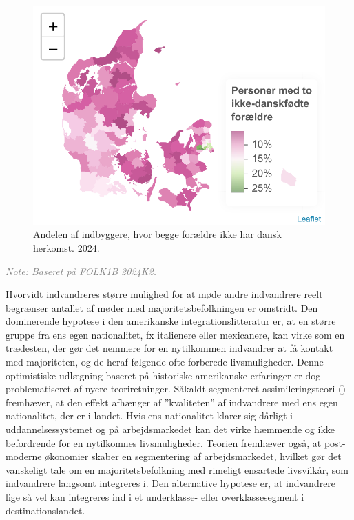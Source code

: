 \documentclass[
]{book}
\begin{document}
\begin{figure}
\includegraphics[width=1\linewidth]{en-befolkning-blander-sig_files/figure-latex/fig-1-22-1} \caption{Andelen af indbyggere, hvor begge forældre ikke har dansk herkomst. 2024.}\label{fig:fig-1-22}
\end{figure}

\begin{footnotesize}\textit{\textcolor{gray}{
Note: Baseret på FOLK1B 2024K2.
}}
\end{footnotesize}

Hvorvidt indvandreres større mulighed for at møde andre indvandrere reelt begrænser antallet af møder med majoritetsbefolkningen er omstridt. Den dominerende hypotese i den amerikanske integrationslitteratur er, at en større gruppe fra ens egen nationalitet, fx italienere eller mexicanere, kan virke som en trædesten, der gør det nemmere for en nytilkommen indvandrer at få kontakt med majoriteten, og de heraf følgende ofte forberede livsmuligheder. Denne optimistiske udlægning baseret på historiske amerikanske erfaringer er dog problematiseret af nyere teoriretninger. Såkaldt segmenteret assimileringsteori () fremhæver, at den effekt afhænger af ''kvaliteten'' af indvandrere med ens egen nationalitet, der er i landet. Hvis ens nationalitet klarer sig dårligt i uddannelsessystemet og på arbejdsmarkedet kan det virke hæmmende og ikke befordrende for en nytilkomnes livsmuligheder. Teorien fremhæver også, at post-moderne økonomier skaber en segmentering af arbejdsmarkedet, hvilket gør det vanskeligt tale om en majoritetsbefolkning med rimeligt ensartede livsvilkår, som indvandrere langsomt integreres i. Den alternative hypotese er, at indvandrere lige så vel kan integreres ind i et underklasse- eller overklassesegment i destinationslandet.
\end{document}
